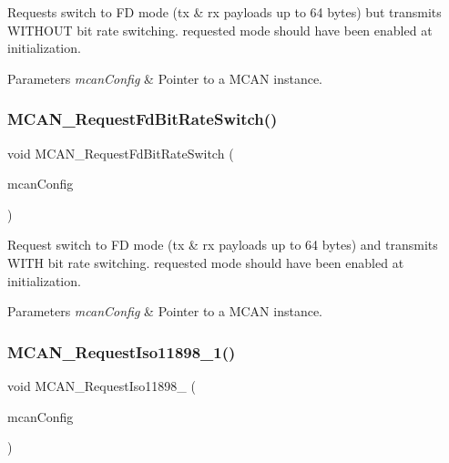 Requests switch to FD mode (tx \& rx payloads up to 64 bytes) but transmits W\+I\+T\+H\+O\+UT bit rate switching. requested mode should have been enabled at initialization. 


\begin{DoxyParams}{Parameters}
{\em mcan\+Config} & Pointer to a M\+C\+AN instance. \\
\hline
\end{DoxyParams}
\mbox{\label{group__can__module_gaa1d5fa926fb534c0dea67923865fb356}} 
\subsubsection{\texorpdfstring{MCAN\_RequestFdBitRateSwitch()}{MCAN\_RequestFdBitRateSwitch()}}
{\footnotesize\ttfamily void M\+C\+A\+N\+\_\+\+Request\+Fd\+Bit\+Rate\+Switch (\begin{DoxyParamCaption}\item[{const \mbox{\hyperlink{structMCan__ConfigTag}{M\+Can\+\_\+\+Config\+Type}} $\ast$}]{mcan\+Config }\end{DoxyParamCaption})}



Request switch to FD mode (tx \& rx payloads up to 64 bytes) and transmits W\+I\+TH bit rate switching. requested mode should have been enabled at initialization. 


\begin{DoxyParams}{Parameters}
{\em mcan\+Config} & Pointer to a M\+C\+AN instance. \\
\hline
\end{DoxyParams}
\mbox{\label{group__can__module_gac2744eec323b9b5ba844c433362d0501}} 
\subsubsection{\texorpdfstring{MCAN\_RequestIso11898\_1()}{MCAN\_RequestIso11898\_1()}}
{\footnotesize\ttfamily void M\+C\+A\+N\+\_\+\+Request\+Iso11898\+\_ (\begin{DoxyParamCaption}\item[{const \mbox{\hyperlink{structMCan__ConfigTag}{M\+Can\+\_\+\+Config\+Type}} $\ast$}]{mcan\+Config }\end{DoxyParamCaption})}



